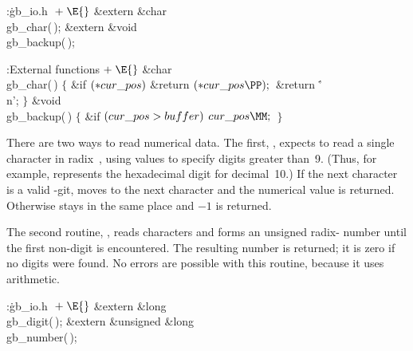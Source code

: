 \Y\B\4:\.{gb\_io.h }\X${}\mathrel+\E{}$\6
\&{extern} \&{char} \\{gb\_char}(\,);\6
\&{extern} \&{void} \\{gb\_backup}(\,);\par
\fi

\B{}:External functions\X${}\mathrel+\E{}$\6
\1\1\&{char} \\{gb\_char}(\,)\2\2\6
${}\{{}$\1\6
\&{if} ${}({*}\\{cur\_pos}){}$\1\5
\&{return} ${}({*}\\{cur\_pos}\PP);{}$\2\6
\&{return} \.{'\\n'};\6
\4${}\}{}$\2\7
\1\1\&{void} \\{gb\_backup}(\,)\2\2\6
${}\{{}$\1\6
\&{if} ${}(\\{cur\_pos}>\\{buffer}){}$\1\5
${}\\{cur\_pos}\MM;{}$\2\6
\4${}\}{}$\2\par
\fi

There are two ways to read numerical data. The first, ,
expects to read a single character in radix~, using 
values
to specify digits greater than~9. (Thus, for example,  represents
the hexadecimal digit for decimal~10.)
If the next character is a valid -git,
 moves to the next character and the numerical value is
returned.
Otherwise  stays in the same place and $-1$ is returned.

The second routine, , reads characters and forms an
unsigned radix- number until the first non-digit is encountered.
The resulting number is returned; it is zero if no digits were found.
No errors are possible with this routine, because it uses
 arithmetic.

\Y\B\4:\.{gb\_io.h }\X${}\mathrel+\E{}$\6
\&{extern} \&{long} \\{gb\_digit}(\,);\6
\&{extern} \&{unsigned} \&{long} \\{gb\_number}(\,);\par
\fi

